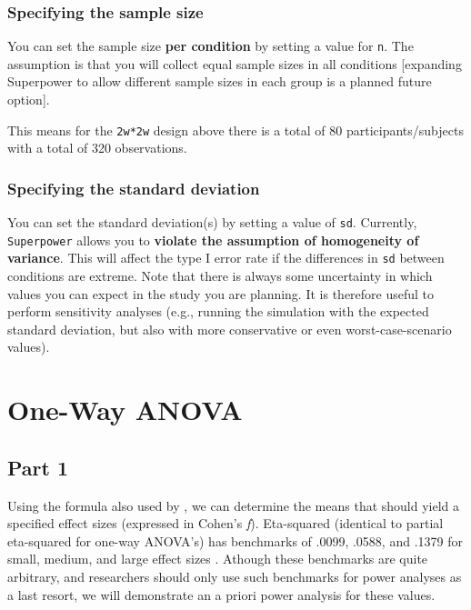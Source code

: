 \documentclass[
]{book}
\begin{document}
\hypertarget{specifying-the-sample-size}{%
\subsection{Specifying the sample size}\label{specifying-the-sample-size}}

You can set the sample size \textbf{per condition} by setting a value for \texttt{n}. The assumption is that you will collect equal sample sizes in all conditions {[}expanding Superpower to allow different sample sizes in each group is a planned future option{]}.

This means for the \texttt{2w*2w} design above there is a total of 80 participants/subjects with a total of 320 observations.

\hypertarget{specifying-the-standard-deviation}{%
\subsection{Specifying the standard deviation}\label{specifying-the-standard-deviation}}

You can set the standard deviation(s) by setting a value of \texttt{sd}. Currently, \texttt{Superpower} allows you to \textbf{violate the assumption of homogeneity of variance}. This will affect the type I error rate if the differences in \texttt{sd} between conditions are extreme. Note that there is always some uncertainty in which values you can expect in the study you are planning. It is therefore useful to perform sensitivity analyses (e.g., running the simulation with the expected standard deviation, but also with more conservative or even worst-case-scenario values).

\hypertarget{one-way-anova}{%
\chapter{One-Way ANOVA}\label{one-way-anova}}

\hypertarget{part-1}{%
\section{Part 1}\label{part-1}}

Using the formula also used by \citet{albers2018power}, we can determine the means that should yield a specified effect sizes (expressed in Cohen's \emph{f}). Eta-squared (identical to partial eta-squared for one-way ANOVA's) has benchmarks of .0099, .0588, and .1379 for small, medium, and large effect sizes \citep{cohen1988spa}. Athough these benchmarks are quite arbitrary, and researchers should only use such benchmarks for power analyses as a last resort, we will demonstrate an a priori power analysis for these values.
\end{document}
